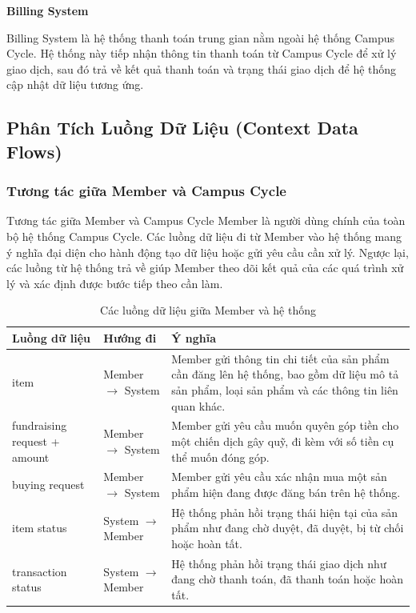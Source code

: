 \documentclass[12pt,a4paper]{report}
\begin{document}
\textbf{Billing System}

Billing System là hệ thống thanh toán trung gian nằm ngoài hệ thống Campus
Cycle. Hệ thống này tiếp nhận thông tin thanh toán từ Campus Cycle để xử lý
giao dịch, sau đó trả về kết quả thanh toán và trạng thái giao dịch để hệ thống
cập nhật dữ liệu tương ứng.

\subsection{ Phân Tích Luồng Dữ Liệu (Context Data Flows)}

\subsubsection{Tương tác giữa Member và Campus Cycle}

Tương tác giữa Member và Campus Cycle Member là người dùng chính của
toàn bộ hệ thống Campus Cycle. Các luồng dữ liệu đi từ Member vào hệ thống
mang ý nghĩa đại diện cho hành động tạo dữ liệu hoặc gửi yêu cầu cần xử lý. Ngược
lại, các luồng từ hệ thống trả về giúp Member theo dõi kết quả của các quá trình
xử lý và xác định được bước tiếp theo cần làm.

\begin{table}[H]
\centering
\caption{Các luồng dữ liệu giữa Member và hệ thống}
\label{tab:member-system-data-flow}

\begin{tabular}{|p{4cm}|p{4cm}|p{7cm}|}
\hline
\textbf{Luồng dữ liệu} & \textbf{Hướng đi} & \textbf{Ý nghĩa} \\
\hline

item &
Member $\rightarrow$ System &
Member gửi thông tin chi tiết của sản phẩm cần đăng lên hệ thống, bao gồm dữ liệu mô tả sản phẩm, loại sản phẩm và các thông tin liên quan khác. \\
\hline

fundraising request + amount &
Member $\rightarrow$ System &
Member gửi yêu cầu muốn quyên góp tiền cho một chiến dịch gây quỹ, đi kèm với số tiền cụ thể muốn đóng góp. \\
\hline

buying request &
Member $\rightarrow$ System &
Member gửi yêu cầu xác nhận mua một sản phẩm hiện đang được đăng bán trên hệ thống. \\
\hline

item status &
System $\rightarrow$ Member &
Hệ thống phản hồi trạng thái hiện tại của sản phẩm như đang chờ duyệt, đã duyệt, bị từ chối hoặc hoàn tất. \\
\hline

transaction status &
System $\rightarrow$ Member &
Hệ thống phản hồi trạng thái giao dịch như đang chờ thanh toán, đã thanh toán hoặc hoàn tất. \\
\hline

\end{tabular}
\end{table}
\end{document}
